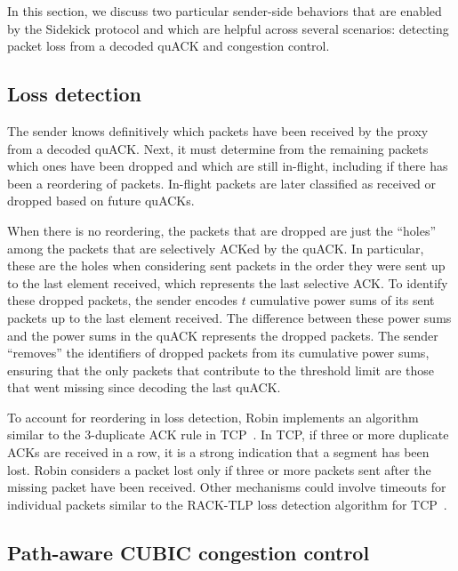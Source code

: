 In this section, we discuss two particular sender-side behaviors that are enabled by
the Sidekick protocol and which are helpful across several scenarios: detecting packet loss
from a decoded quACK and congestion control.

\subsection{Loss detection}
\label{sec:sidekick:sender:loss-detection}

The sender knows definitively which packets have been received by the proxy from
a decoded quACK. Next, it must determine from the remaining packets which ones
have been dropped and which are still in-flight, including if there has been a
reordering of packets. In-flight packets are later
classified as received or dropped based on future quACKs.

When there is no reordering, the packets that are dropped are just the ``holes''
among the packets that are selectively ACKed by the quACK. In particular, these
are the holes when considering sent packets in the order they were sent up to
the last element received, which represents the last selective ACK.
To identify these dropped packets, the sender encodes $t$ cumulative power sums
of its sent packets up to the last element received.
The difference between these power sums and the power
sums in the quACK represents the dropped packets. The sender ``removes'' the
identifiers of dropped packets from its cumulative power sums, ensuring that
the only packets that contribute to the threshold limit are those that
went missing since decoding the last quACK.

To account for reordering in loss detection, Robin implements an algorithm
similar to the 3-duplicate ACK rule in TCP~\cite{rfc5681tcp,rfc2001tcp}.
In TCP, if three or more duplicate ACKs are received in a row, it is a strong
indication that a segment has been lost. Robin considers a packet lost only if
three or more packets sent after the missing packet have been received.
Other mechanisms could involve timeouts for individual packets similar to the
RACK-TLP loss detection algorithm for TCP~\cite{rfc8985}.

\subsection{Path-aware CUBIC congestion control}
\label{sec:sidekick:sender:pacubic}

